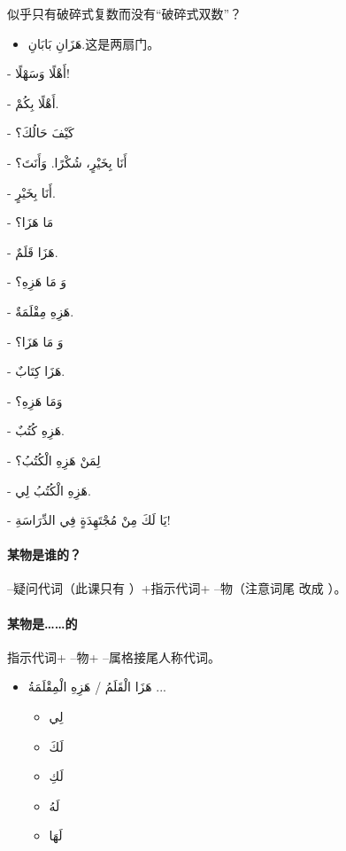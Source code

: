\begin{note}
    似乎只有破碎式复数而没有``破碎式双数''？
    \begin{itemize}
        \item \ac{هَزَانِ بَابَانِ.}{这是两扇门。}
    \end{itemize}
\end{note}

\begin{Arabic}
    - أَهْلًا وَسَهْلًا!

    - أَهْلًا بِكُمْ.

    - كَيْفَ حَالُكَ؟

    - أَنَا بِخَيْرٍ، شُكْرًا. وَأَنَتَ؟

    - أَنَا بِخَيْرٍ.

    - مَا هَزَا؟

    - هَزَا قَلَمٌ.

    - وَ مَا هَزِهِ؟

    - هَزِهِ مِقْلَمَةٌ.

    - وَ مَا هَزَا؟

    - هَزَا كِتَابٌ.

    - وَمَا هَزِهِ؟

    - هَزِهِ كُتُبٌ.

    - لِمَنْ هَزِهِ الْكُتُبُ؟

    - هَزِهِ الْكُتُبُ لِي.

    - يَا لَكَ مِنْ مُجْتَهِدَةٍ فِي الدِّرَاسَةِ!
\end{Arabic}

\paragraph{某物是谁的？} --疑问代词（此课只有 ）+指示代词+ --物（注意词尾  改成 ）。

\paragraph{某物是……的} 指示代词+ --物+ --属格接尾人称代词。

\begin{Arabic}
    \begin{itemize}
        \item هَزَا الْقَلَمُ / هَزِهِ الْمِقْلَمَةُ ...
        \begin{itemize}[label=\crm{--}]
            \item لِي
            \item لَكَ
            \item لَكِ
            \item لَهُ
            \item لَهَا
        \end{itemize}
    \end{itemize}
\end{Arabic}

